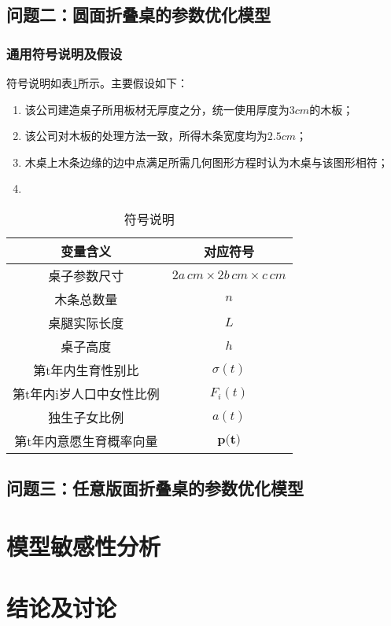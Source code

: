 \documentclass[12pt,a4paper]{article}
\begin{document}
\subsection{问题二：圆面折叠桌的参数优化模型}
\subsubsection{通用符号说明及假设}
符号说明如表\ref{t:notas}所示。主要假设如下：
\begin{enumerate}
\item 该公司建造桌子所用板材无厚度之分，统一使用厚度为$3cm$的木板；
\item 该公司对木板的处理方法一致，所得木条宽度均为$2.5cm$；
\item 木桌上木条边缘的边中点满足所需几何图形方程时认为木桌与该图形相符；
\item 
\end{enumerate}

\renewcommand{\tablename}{表}
\begin{table}[h!]
\centering
\begin{tabular}{c c}
 \hline
 变量含义 & 对应符号 \\ [0.5ex] 
 \hline
 桌子参数尺寸 & $2a\,cm \times 2b\,cm \times c\,cm$ \\
 木条总数量 & $n$ \\
 桌腿实际长度 & $L$ \\
 桌子高度 & $h$ \\
 第t年内生育性别比 & $\sigma(t)$ \\
 第t年内i岁人口中女性比例 & $F_i(t)$ \\
 独生子女比例 & $a(t)$ \\
 第t年内意愿生育概率向量 & $\textbf{p(t)}$ \\ [.5ex]
 \hline
\end{tabular}
\caption{符号说明}
\label{t:notas}
\end{table}

\subsection{问题三：任意版面折叠桌的参数优化模型}
\section{模型敏感性分析}
\section{结论及讨论}

\medskip
\renewcommand\refname{参考文献}


\end{document}
